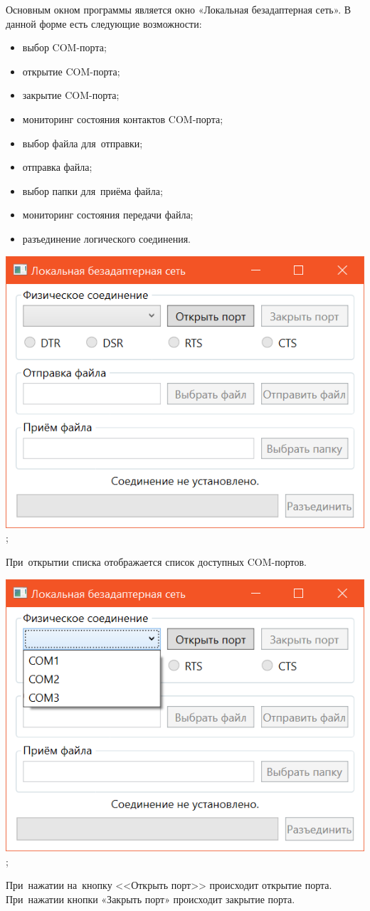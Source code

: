 \documentclass[a4paper,12pt]{article}
\begin{document}
Основным окном программы является окно «Локальная безадаптерная сеть». В данной форме есть следующие возможности:
\begin{itemize}
\item выбор COM-порта;
\item открытие COM-порта;
\item закрытие COM-порта;
\item мониторинг состояния контактов COM-порта;
\item выбор файла для~отправки;
\item отправка файла;
\item выбор папки для~приёма файла;
\item мониторинг состояния передачи файла;
\item разъединение логического соединения.
\end{itemize}
\begin{center}
\includegraphics{window.png};
\end{center}

При~открытии списка отображается список доступных COM-портов.
\begin{center}
\includegraphics{list.png};
\end{center}
При~нажатии на~кнопку <<Открыть порт>> происходит открытие порта. При~нажатии кнопки «Закрыть порт» происходит закрытие порта.
\end{document}
